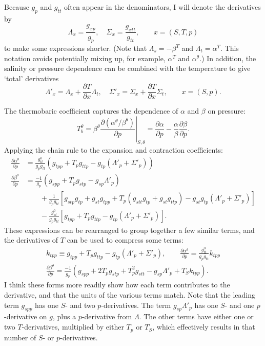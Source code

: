 \documentclass{article}
\begin{document}
Because $g_p$ and $g_{tt}$ often appear in the denominators, I will denote the derivatives by
\begin{equation*}
    \Lambda_x = \frac{g_{xp}}{g_p}, \quad \Sigma_x = \frac{g_{xtt}}{g_{tt}}, \qquad x = (S,T,p)
\end{equation*}
to make some expressions shorter. (Note that $\Lambda_s = -\beta^T$ and $\Lambda_t = \alpha^T$. This notation avoids potentially mixing up, for example, $\alpha^T$ and $\alpha^{\theta}$.) In addition, the salinity or pressure dependence can be combined with the temperature to give `total' derivatives
\begin{equation*}
    \Lambda'_x = \Lambda_x + \frac{\partial T}{\partial x} \Lambda_t, \quad \Sigma'_x = \Sigma_x + \frac{\partial T}{\partial x} \Sigma_t, \qquad x = (S,p).
\end{equation*}

The thermobaric coefficient captures the dependence of $\alpha$ and $\beta$ on pressure:
\begin{equation*}
    T_b^{\theta} = \beta^{\theta} \left. \frac{\partial (\alpha^{\theta}/\beta^{\theta})}{\partial p} \right|_{S,\theta} = \frac{\partial \alpha}{\partial p} - \frac{\alpha}{\beta} \frac{\partial \beta}{\partial p}.
\end{equation*}
Applying the chain rule to the expansion and contraction coefficients:
\begin{align*}
    \frac{\partial \alpha^{\theta}}{\partial p} &= \frac{g^0_{tt}}{g_p g_{tt}} \left( g_{tpp} + T_p g_{ttp} - g_{tp} (\Lambda'_p + \Sigma'_p) \right) \\
    \frac{\partial \beta^{\theta}}{\partial p} &= \frac{-1}{g_p} \left( g_{spp} + T_p g_{stp} - g_{sp} \Lambda'_p \right) \\
    &\qquad + \frac{1}{g_p g_{tt}} \left[ g_{stp} g_{tp} + g_{st} g_{tpp} + T_p (g_{stt} g_{tp} + g_{st} g_{ttp}) - g_{st} g_{tp} (\Lambda'_p + \Sigma'_p) \right] \\
    &\qquad - \frac{g^0_{st}}{g_p g_{tt}} \left[ g_{tpp} + T_p g_{ttp} - g_{tp} (\Lambda'_p + \Sigma'_p) \right].
\end{align*}
These expressions can be rearranged to group together a few similar terms, and the derivatives of $T$ can be used to compress some terms:
\begin{gather*}
    k_{tpp} \equiv g_{tpp} + T_p g_{ttp} - g_{tp} (\Lambda'_p + \Sigma'_p), \qquad \frac{\partial \alpha^{\theta}}{\partial p} = \frac{g^0_{tt}}{g_p g_{tt}} k_{tpp} \\
    \frac{\partial \beta^{\theta}}{\partial p} = \frac{-1}{g_p} \left( g_{spp} + 2 T_p g_{stp} + T_p^2 g_{stt} - g_{sp} \Lambda'_p + T_S k_{tpp} \right).
\end{gather*}
I think these forms more readily show how each term contributes to the derivative, and that the units of the various terms match. Note that the leading term $g_{spp}$ has one $S$- and two $p$-derivatives. The term $g_{sp} \Lambda'_p$ has one $S$- and one $p$-derivative on $g$, plus a $p$-derivative from $\Lambda$. The other terms have either one or two $T$-derivatives, multiplied by either $T_p$ or $T_S$, which effectively results in that number of $S$- or $p$-derivatives.
\end{document}
